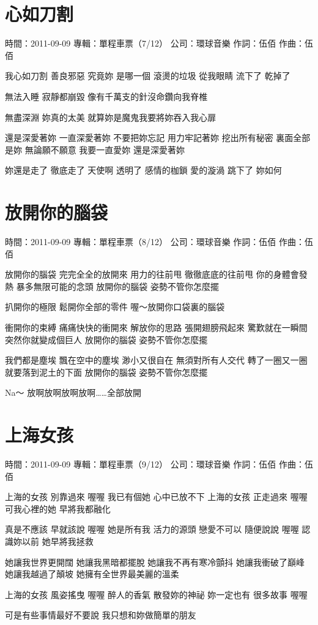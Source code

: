 \documentclass[UTF8,a4paper,oneside,twocolumn,12pt]{ctexbook}
\newcommand{\infopair}[2]{\textbullet #1：#2}
\newcommand{\zc}[1][伍佰]{\infopair{作詞}{#1}}
\newcommand{\zq}[1][伍佰]{\infopair{作曲}{#1}}
\newcommand{\zj}[1]{\infopair{專輯}{#1}}
\newcommand{\sj}[1]{\infopair{時間}{#1}}
\newcommand{\gs}[1]{\infopair{公司}{#1}}
\newenvironment{info}{\begin{flushleft}\kaishu
	}
	{\end{flushleft}\normalsize\yahei\par}
\newenvironment{lyric}{
	}
{}
\begin{document}
\section{心如刀割}
\begin{info}
	\sj{2011-09-09}
	\zj{單程車票（7/12）}
	\gs{環球音樂}
	\zc
	\zq
\end{info}
\begin{lyric}
	我心如刀割 善良邪惡 究竟妳 是哪一個
	滾燙的垃圾 從我眼睛 流下了 乾掉了

	無法入睡 寂靜都崩毀
	像有千萬支的針沒命鑽向我脊椎

	無盡深淵 妳真的太美
	就算妳是魔鬼我要將妳吞入我心扉

	還是深愛著妳 一直深愛著妳
	不要把妳忘記 用力牢記著妳
	挖出所有秘密 裏面全部是妳
	無論願不願意 我要一直愛妳
	還是深愛著妳

	妳還是走了 徹底走了 天使啊 透明了
	感情的枷鎖 愛的漩渦 跳下了 妳如何
\end{lyric}

\section{放開你的腦袋}
\begin{info}
	\sj{2011-09-09}
	\zj{單程車票（8/12）}
	\gs{環球音樂}
	\zc
	\zq
\end{info}
\begin{lyric}
	放開你的腦袋
	完完全全的放開來
	用力的往前甩
	徹徹底底的往前甩
	你的身體會發熱
	暴多無限可能的念頭
	放開你的腦袋
	姿勢不管你怎麼擺

	扒開你的極限
	鬆開你全部的零件
	喔～放開你口袋裏的腦袋

	衝開你的束縛
	痛痛快快的衝開來
	解放你的思路
	張開翅膀飛起來
	驚歎就在一瞬間
	突然你就變成個巨人
	放開你的腦袋
	姿勢不管你怎麼擺

	我們都是塵埃
	飄在空中的塵埃
	渺小又很自在
	無須對所有人交代
	轉了一圈又一圈
	就要落到泥土的下面
	放開你的腦袋
	姿勢不管你怎麼擺

	Na～
	放啊放啊放啊放啊……全部放開
\end{lyric}

\section{上海女孩}
\begin{info}
	\sj{2011-09-09}
	\zj{單程車票（9/12）}
	\gs{環球音樂}
	\zc
	\zq
\end{info}
\begin{lyric}
	上海的女孩 別靠過來 喔喔
	我已有個她 心中已放不下
	上海的女孩 正走過來 喔喔
	可我心裡的她 早將我都融化

	真是不應該 早就該說 喔喔
	她是所有我 活力的源頭
	戀愛不可以 隨便說說 喔喔
	認識妳以前 她早將我拯救

	她讓我世界更開闊
	她讓我黑暗都擺脫
	她讓我不再有寒冷顫抖
	她讓我衝破了巔峰
	她讓我越過了顛坡
	她擁有全世界最美麗的溫柔

	上海的女孩 風姿搖曳 喔喔
	醉人的香氣 散發妳的神祕
	妳一定也有 很多故事 喔喔

	可是有些事情最好不要說
	我只想和妳做簡單的朋友
\end{lyric}
\end{document}
